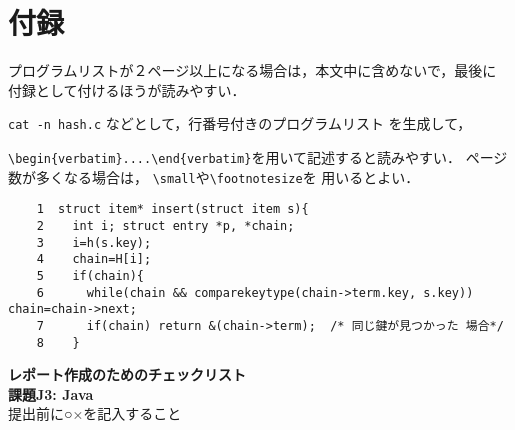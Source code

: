 \documentclass[11pt,a4j]{jarticle}
\begin{document}
\section{付録}
プログラムリストが２ページ以上になる場合は，本文中に含めないで，最後に
付録として付けるほうが読みやすい．

\verb|cat -n hash.c| などとして，行番号付きのプログラムリスト
を生成して，

\noindent
\verb|\begin{verbatim}....\end{verbatim}|を用いて記述すると読みやすい．
ページ数が多くなる場合は，
\verb|\small|や\verb|\footnotesize|を
用いるとよい．

\begin{small}
\begin{verbatim}
    1  struct item* insert(struct item s){
    2    int i; struct entry *p, *chain;
    3    i=h(s.key);
    4    chain=H[i];
    5    if(chain){
    6      while(chain && comparekeytype(chain->term.key, s.key)) chain=chain->next;
    7      if(chain) return &(chain->term);  /* 同じ鍵が見つかった 場合*/
    8    }

\end{verbatim}
\end{small}
\newpage
\begin{Huge}
\begin{center}
{\bf レポート作成のためのチェックリスト\\
課題J3: Java\\}
提出前に○×を記入すること\\
\vskip 5mm

\end{center}
\end{Huge}
\end{document}
